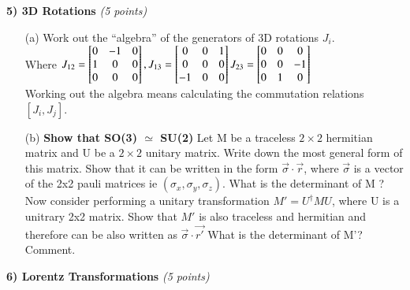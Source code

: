 \textbf{5) 3D Rotations } \hfill \textit{(5 points)}
\begin{itemize}
\item[(a)]Work out the ``algebra'' of the generators of 3D rotations $J_i$. \\
Where $
J_{12} =  \begin{bmatrix}    0 & -1 & 0  \\ 1 & 0  & 0 \\ 0 & 0 & 0 \end{bmatrix}, 
\hfill
 J_{13} =  \begin{bmatrix}    0 & 0 & 1  \\ 0 & 0  & 0 \\ -1 & 0 & 0 \end{bmatrix} 
\hfill
 J_{23} =  \begin{bmatrix}    0 & 0 & 0  \\ 0 & 0  & -1 \\ 0 & 1 & 0 \end{bmatrix} 
$\\
Working out the algebra means calculating the commutation relations $[J_i,J_j]$.
\item[(b)]\textbf{Show that SO(3) $\simeq$ SU(2)}
Let M be a traceless $2\times2$ hermitian matrix and U be a $2\times2$  unitary matrix.  
Write down the most general form of this matrix.
Show that it can be written in the form $\vec{\sigma}\cdot\vec{r}$, where $\vec{\sigma}$ is a vector of the 2x2 pauli matrices ie $(\sigma_x,\sigma_y,\sigma_z)$.
What is the determinant of M ?
Now consider performing a unitary transformation $M' = U^{\dagger}MU$, where U is a unitrary 2x2 matrix.
Show that $M'$ is also traceless and hermitian and therefore can be also written as $\vec{\sigma}\cdot\vec{r'}$
What is the determinant of M'?
Comment.
\end{itemize}

\vspace*{0.25in}

\textbf{6) Lorentz Transformations} \hfill \textit{(5 points)}

